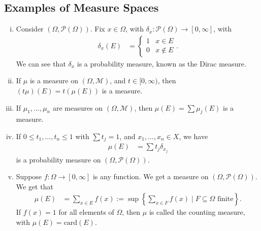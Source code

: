 \documentclass[10pt]{extarticle}
\newcommand{\card}{\text{card}}
\begin{document}
  \subsection{Examples of Measure Spaces}%
  \begin{enumerate}[(i)]
    \item Consider $(\Omega,\mathcal{P}(\Omega))$. Fix $x\in \Omega$, with $\delta_x: \mathcal{P}(\Omega)\rightarrow [0,\infty]$, with
      \begin{align*}
        \delta_x(E) &= \begin{cases}
          1 & x\in E\\
          0 & x\notin E
        \end{cases}.
      \end{align*}
      We can see that $\delta_x$ is a probability measure, known as the Dirac measure.
    \item If $\mu$ is a measure on $(\Omega,\mathcal{M})$, and $t\in [0,\infty)$, then $\left(t\mu\right)(E) = t\left(\mu(E)\right)$ is a measure.
    \item If $\mu_1,\dots,\mu_n$ are measures on $(\Omega,\mathcal{M})$, then $\mu(E) = \sum \mu_j(E)$ is a measure.
    \item If $0\leq t_1,\dots,t_n\leq 1$ with $\sum t_j = 1$, and $x_1,\dots,x_n\in X$, we have
      \begin{align*}
        \mu(E) &= \sum t_j\delta_{x_j}
      \end{align*}
      is a probability measure on $(\Omega,\mathcal{P}(\Omega))$.
    \item Suppose $f: \Omega \rightarrow [0,\infty]$ is any function. We get a measure on $(\Omega,\mathcal{P}(\Omega))$. We get that
      \begin{align*}
        \mu(E) &= \sum_{x\in E}f(x) := \sup \left\{\sum_{x\in F} f(x)\mid F\subseteq \Omega \text{ finite}\right\}.
      \end{align*}
      If $f(x) = 1$ for all elements of $\Omega$, then $\mu$ is called the counting measure, with $\mu(E) = \card(E)$.
  \end{enumerate}
\end{document}
